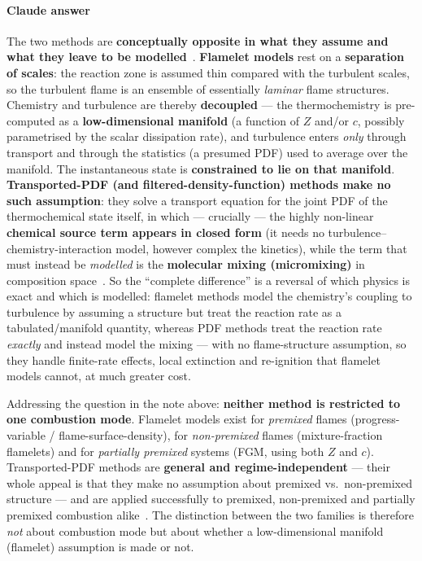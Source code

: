 {\color{istblue}
\paragraph{Claude answer}
The two methods are \textbf{conceptually opposite in what they assume and what they leave to be modelled}~\cite{lecture10,veynante2002turbulent,pope1985pdf}. \textbf{Flamelet models} rest on a \textbf{separation of scales}: the reaction zone is assumed thin compared with the turbulent scales, so the turbulent flame is an ensemble of essentially \emph{laminar} flame structures. Chemistry and turbulence are thereby \textbf{decoupled} --- the thermochemistry is pre-computed as a \textbf{low-dimensional manifold} (a function of $Z$ and/or $c$, possibly parametrised by the scalar dissipation rate), and turbulence enters \emph{only} through transport and through the statistics (a presumed PDF) used to average over the manifold. The instantaneous state is \textbf{constrained to lie on that manifold}. \textbf{Transported-PDF (and filtered-density-function) methods make no such assumption}: they solve a transport equation for the joint PDF of the thermochemical state itself, in which --- crucially --- the highly non-linear \textbf{chemical source term appears in closed form} (it needs no turbulence--chemistry-interaction model, however complex the kinetics), while the term that must instead be \emph{modelled} is the \textbf{molecular mixing (micromixing)} in composition space~\cite{lecture10,pope1985pdf,haworth2010pdf}. So the ``complete difference'' is a reversal of which physics is exact and which is modelled: flamelet methods model the chemistry's coupling to turbulence by assuming a structure but treat the reaction rate as a tabulated/manifold quantity, whereas PDF methods treat the reaction rate \emph{exactly} and instead model the mixing --- with no flame-structure assumption, so they handle finite-rate effects, local extinction and re-ignition that flamelet models cannot, at much greater cost.

Addressing the question in the note above: \textbf{neither method is restricted to one combustion mode}. Flamelet models exist for \emph{premixed} flames (progress-variable / flame-surface-density), for \emph{non-premixed} flames (mixture-fraction flamelets) and for \emph{partially premixed} systems (FGM, using both $Z$ and $c$). Transported-PDF methods are \textbf{general and regime-independent} --- their whole appeal is that they make no assumption about premixed vs.\ non-premixed structure --- and are applied successfully to premixed, non-premixed and partially premixed combustion alike~\cite{lecture10,haworth2010pdf,veynante2002turbulent}. The distinction between the two families is therefore \emph{not} about combustion mode but about whether a low-dimensional manifold (flamelet) assumption is made or not.
}




